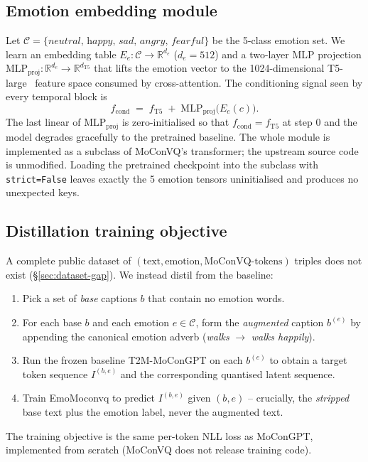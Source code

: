 \documentclass[conference]{IEEEtran}
\begin{document}
\subsection{Emotion embedding module}
Let $\mathcal{C}=\{\textit{neutral, happy, sad, angry, fearful}\}$ be the
5-class emotion set. We learn an embedding table
$E_e:\mathcal{C}\!\to\!\mathbb{R}^{d_e}$ ($d_e\!=\!512$) and a two-layer
MLP projection $\text{MLP}_{\text{proj}}:\mathbb{R}^{d_e}\!\to\!
\mathbb{R}^{d_{\text{T5}}}$ that lifts the emotion vector to the
1024-dimensional T5-large~\cite{raffel2020t5} feature space consumed by
cross-attention. The conditioning signal seen by every temporal block is
\begin{equation}
  f_{\text{cond}} \;=\; f_{\text{T5}}
  \;+\;\text{MLP}_{\text{proj}}\!\bigl(E_e(c)\bigr).
  \label{eq:fuse}
\end{equation}
The last linear of $\text{MLP}_{\text{proj}}$ is zero-initialised so that
$f_{\text{cond}}\!=\!f_{\text{T5}}$ at step 0 and the model degrades
gracefully to the pretrained baseline. The whole module is implemented
as a subclass of MoConVQ's transformer; the upstream source code is
unmodified. Loading the pretrained checkpoint into the subclass with
\texttt{strict=False} leaves exactly the 5 emotion tensors uninitialised
and produces no unexpected keys.

\subsection{Distillation training objective}
\label{sec:distill}
A complete public dataset of $(\text{text}, \text{emotion},
\text{MoConVQ-tokens})$ triples does not exist (\S\ref{sec:dataset-gap}).
We instead distil from the baseline:
\begin{enumerate}
\item Pick a set of \emph{base} captions $b$ that contain no emotion
words.
\item For each base $b$ and each emotion $e \in \mathcal{C}$, form the
\emph{augmented} caption $b^{(e)}$ by appending the canonical emotion
adverb (\textit{walks} $\to$ \textit{walks happily}).
\item Run the frozen baseline T2M-MoConGPT on each $b^{(e)}$ to obtain a
target token sequence $I^{(b,e)}$ and the corresponding quantised latent
sequence.
\item Train EmoMoconvq to predict $I^{(b,e)}$ given $(b, e)$ -- crucially,
the \emph{stripped} base text plus the emotion label, never the augmented
text.
\end{enumerate}
The training objective is the same per-token NLL loss as MoConGPT,
implemented from scratch (MoConVQ does not release training code).
\end{document}
